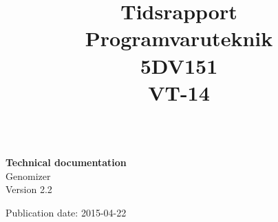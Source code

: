 \title{Tidsrapport \\ 
	Programvaruteknik \\5DV151\\
	VT-14 }
	\begin{titlepage}
		\thispagestyle{empty}
		\begin{large}
			\begin{tabular}{@{}p{\textwidth}@{}}
			\end{tabular}
		\end{large}
		\vspace{35mm}
		\begin{center}
			\Huge{\textbf{Technical documentation}\\ Genomizer} \\
			\vspace{10mm}
			\LARGE{Version 2.2} \\
           \vspace{5mm}
           
            Publication date: 2015-04-22 \\
            

			\vspace{70mm}
            
			\begin{normalsize}				
			\end{normalsize}
		\end{center}
	\end{titlepage}
